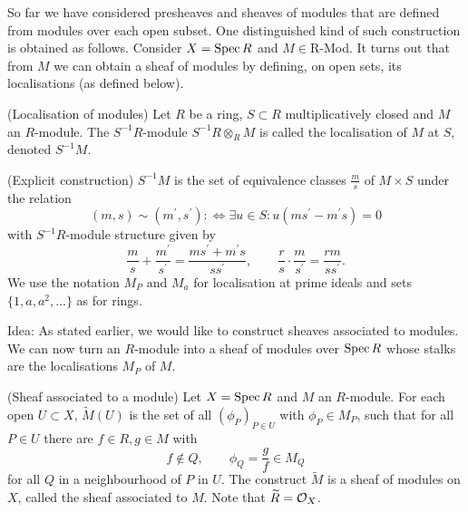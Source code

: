 \documentclass[a4paper,11pt]{article}
\begin{document}
			So far we have considered presheaves and sheaves of modules that are defined from modules over each open subset. One distinguished kind of such construction is obtained as follows. Consider $X=\operatorname{Spec} R$ and $M\in$R-Mod. It turns out that from $M$ we can obtain a sheaf of modules by defining, on open sets, its localisations (as defined below).
			
			\begin{defi}
				(Localisation of modules) Let $R$ be a ring, $S\subset R$ multiplicatively closed and $M$ an $R$-module. The $S^{-1}R$-module $S^{-1}R\otimes_RM$ is called the localisation of $M$ at $S$, denoted $S^{-1}M$.
			\end{defi}

			\begin{remark}
				(Explicit construction) $S^{-1}M$ is the set of equivalence classes $\frac{m}{s}$ of $M\times S$ under the relation
				\begin{equation*}
					(m,s)\sim(m^\prime,s^\prime):\Longleftrightarrow\exists u\in S:u(ms^\prime-m^\prime s)=0
				\end{equation*}
				with $S^{-1}R$-module structure given by
				\begin{equation*}
					\frac{m}{s}+\frac{m^\prime}{s^\prime}=\frac{ms^\prime+m^\prime s}{ss^\prime},\qquad \frac{r}{s}\cdot\frac{m}{s^\prime}=\frac{rm}{ss^\prime}.
				\end{equation*}
				We use the notation $M_P$ and $M_a$ for localisation at prime ideals and sets $\{1,a,a^2,\dots\}$ as for rings.
			\end{remark}

			\noindent Idea: As stated earlier, we would like to construct sheaves associated to modules. We can now turn an $R$-module into a sheaf of modules over $\operatorname{Spec} R$ whose stalks are the localisations $M_P$ of $M$.
			
			\begin{defi}
				(Sheaf associated to a module) Let $X=\operatorname{Spec} R$ and $M$ an $R$-module. For each open $U\subset X$, $\widetilde{M}(U)$ is the set of all $(\phi_P)_{P\in U}$ with $\phi_P\in M_P$, such that for all $P\in U$ there are $f\in R,g\in M$ with 
				\begin{equation*}
					f\notin Q,\qquad\phi_Q=\frac{g}{f}\in M_Q
				\end{equation*}
				for all $Q$ in a neighbourhood of $P$ in $U$. The construct $\widetilde{M}$ is a sheaf of modules on $X$, called the sheaf associated to $M$. Note that $\widetilde{R}=\mathcal{O}_X$.
			\end{defi}
\end{document}
